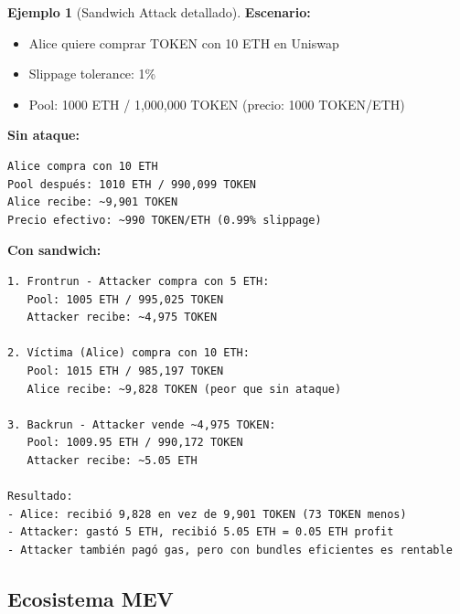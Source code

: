 \documentclass[11pt,a4paper,twoside,openright]{book}
\theoremstyle{definition}
\newtheorem{example}{Ejemplo}[chapter]
\theoremstyle{plain}
\theoremstyle{remark}
\begin{document}
\begin{example}[Sandwich Attack detallado]
\textbf{Escenario:}
\begin{itemize}
    \item Alice quiere comprar TOKEN con 10 ETH en Uniswap
    \item Slippage tolerance: 1\%
    \item Pool: 1000 ETH / 1,000,000 TOKEN (precio: 1000 TOKEN/ETH)
\end{itemize}

\textbf{Sin ataque:}
\begin{verbatim}
Alice compra con 10 ETH
Pool después: 1010 ETH / 990,099 TOKEN
Alice recibe: ~9,901 TOKEN
Precio efectivo: ~990 TOKEN/ETH (0.99% slippage)
\end{verbatim}

\textbf{Con sandwich:}
\begin{verbatim}
1. Frontrun - Attacker compra con 5 ETH:
   Pool: 1005 ETH / 995,025 TOKEN
   Attacker recibe: ~4,975 TOKEN
   
2. Víctima (Alice) compra con 10 ETH:
   Pool: 1015 ETH / 985,197 TOKEN
   Alice recibe: ~9,828 TOKEN (peor que sin ataque)
   
3. Backrun - Attacker vende ~4,975 TOKEN:
   Pool: 1009.95 ETH / 990,172 TOKEN
   Attacker recibe: ~5.05 ETH
   
Resultado:
- Alice: recibió 9,828 en vez de 9,901 TOKEN (73 TOKEN menos)
- Attacker: gastó 5 ETH, recibió 5.05 ETH = 0.05 ETH profit
- Attacker también pagó gas, pero con bundles eficientes es rentable
\end{verbatim}
\end{example}

\subsection{Ecosistema MEV}
\end{document}
